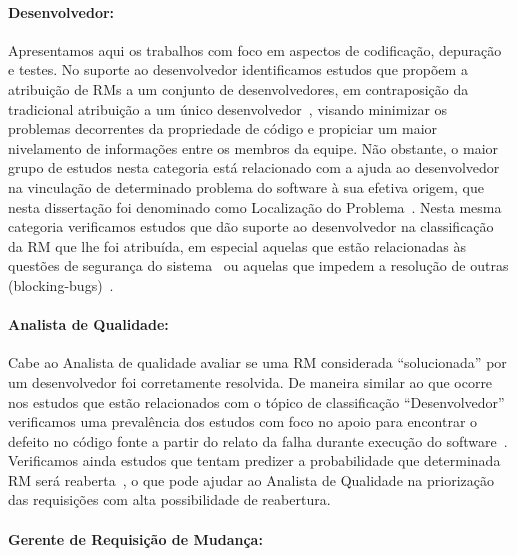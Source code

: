 \paragraph{Desenvolvedor:}

Apresentamos aqui os trabalhos com foco em aspectos de co\-di\-fi\-ca\-ção,
depuração e testes. No suporte ao desenvolvedor identificamos estudos que
propõem a atribuição de RMs a um conjunto de desenvolvedores, em contraposição
da tradicional atribuição a um único desenvolvedor~\cite{banitaan2013decoba},
visando minimizar os pro\-ble\-mas decorrentes da propriedade de código e
propiciar um maior nivelamento de informações entre os membros da equipe. Não
obstante, o maior grupo de estudos nesta categoria está relacionado com a ajuda
ao desenvolvedor na vinculação de determinado problema do software à sua efetiva
origem, que nesta dissertação foi denominado como Localização do
Problema~\cite{corley2011recovering,Wong:2014:BBF:2705615.2706096,
    Thung:2014:BIT:2635868.2661678,Nguyen:2012:MAR:2393596.2393671,thung2013automatic,
    Romo:2015:TAT:2745802.2745833}. Nesta mesma categoria verificamos estudos
que dão suporte ao desenvolvedor na classificação da RM que lhe foi atribuída,
em especial aquelas que estão relacionadas às questões de segurança do
sistema~\cite{gegick2010identifying} ou aquelas que impedem a resolução de
outras (blocking-bugs)~\cite{ValdiviaGarcia:2014:CPB:2597073.2597099}.

\paragraph{Analista de Qualidade:}

Cabe ao Analista de qualidade avaliar se uma RM considerada ``solucionada'' por
um desenvolvedor foi corretamente resolvida. De maneira similar ao que ocorre
nos estudos que estão relacionados com o tópico de classificação
``Desenvolvedor'' verificamos uma prevalência dos estudos com foco no apoio para
encontrar o defeito no código fonte a partir do relato da falha durante execução
do software~\cite{corley2011recovering,Wong:2014:BBF:2705615.2706096,
    Thung:2014:BIT:2635868.2661678,Nguyen:2012:MAR:2393596.2393671,thung2013automatic,
    Romo:2015:TAT:2745802.2745833}. Verificamos ainda estudos que tentam
predizer a probabilidade que determinada RM será
reaberta~\cite{xia2015automatic}, o que pode ajudar ao Analista de Qualidade na
priorização das requisições com alta possibilidade de reabertura.

\paragraph{Gerente de Requisição de	Mudança:}

